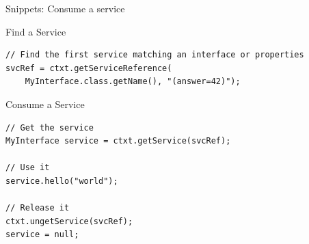 \begin{frame}[fragile]{Snippets: Consume a service}
\begin{small}
\begin{block}{Find a Service}
\begin{verbatim}
// Find the first service matching an interface or properties
svcRef = ctxt.getServiceReference(
	MyInterface.class.getName(), "(answer=42)");
\end{verbatim}
\vspace{-.8em}
\end{block}

\begin{block}{Consume a Service}
\begin{verbatim}
// Get the service
MyInterface service = ctxt.getService(svcRef);

// Use it
service.hello("world");

// Release it
ctxt.ungetService(svcRef);
service = null;
\end{verbatim}
\vspace{-.8em}
\end{block}
\end{small}
\end{frame}
